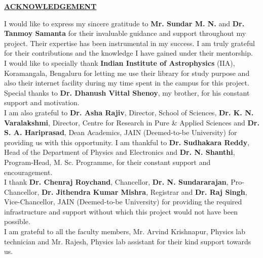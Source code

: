\message{ !name(main.tex)}\documentclass[12pt]{article}
\def \gnameOne {Mr. Sundar M. N.}
\def \gnameTwo {Dr. Tanmoy Samanta}
\def \director {Dr. Asha Rajiv}
\def \hod {Dr. Sudhakara Reddy}
\begin{document}
\thispagestyle{empty}


\begin{center}

    \Large{\underline{\textbf{ACKNOWLEDGEMENT}}}\\

\end{center}

\noindent
I would like to express my sincere gratitude to \textbf{\gnameOne} and \textbf{\gnameTwo} for their invaluable guidance and support throughout my project. Their expertise has been instrumental in my success. I am truly grateful for their contributions and the knowledge I have gained under their mentorship.\\

\noindent I would like to specially thank \textbf{Indian Institute of Astrophysics} (IIA), Koramangala, Bengaluru for letting me use their library for study purpose and also their internet facility during my time spent in the campus for this project.\\

\noindent Special thanks to \textbf{Dr. Dhanush Vittal Shenoy}, my brother, for his constant support and motivation.\\

\noindent
I am also grateful to \textbf{\director}, Director, School of Sciences, \textbf{Dr. K. N. Varalakshmi}, Director, Centre for Research in Pure \& Applied Sciences and \textbf{Dr. S. A. Hariprasad}, Dean Academics, JAIN (Deemed-to-be University) for providing us with this opportunity. I am thankful to \textbf{\hod}, Head of the Department of Physics and Electronics and \textbf{Dr. N. Shanthi}, Program-Head, M. Sc. Programme, for their constant support and encouragement.\\

\noindent
I thank \textbf{Dr. Chenraj Roychand}, Chancellor, \textbf{Dr. N. Sundararajan}, Pro-Chancellor, \textbf{Dr. Jithendra Kumar Mishra}, Registrar and \textbf{Dr. Raj Singh}, Vice-Chancellor, JAIN (Deemed-to-be University) for providing the required infrastructure and support without which this project would not have been possible.\\

\noindent
I am grateful to all the faculty members, Mr. Arvind Krishnapur, Physics lab technician and Mr. Rajesh, Physics lab assistant for their kind support towards us.\\
\end{document}
